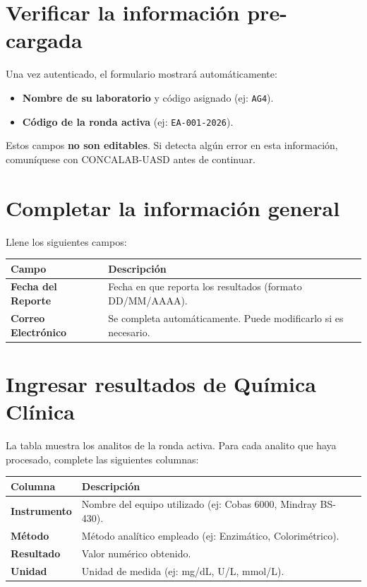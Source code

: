 \documentclass[12pt, letterpaper]{article}
\begin{document}
\section{Verificar la información pre-cargada}

Una vez autenticado, el formulario mostrará automáticamente:

\begin{itemize}[leftmargin=1.5em]
  \item \textbf{Nombre de su laboratorio} y código asignado (ej: \texttt{AG4}).
  \item \textbf{Código de la ronda activa} (ej: \texttt{EA-001-2026}).
\end{itemize}

Estos campos \textbf{no son editables}. Si detecta algún error en esta información, comuníquese con CONCALAB-UASD antes de continuar.

\section{Completar la información general}

Llene los siguientes campos:

\vspace{0.5em}
\begin{tabularx}{\linewidth}{>{\bfseries}lX}
  \toprule
  Campo & Descripción \\
  \midrule
  Fecha del Reporte    & Fecha en que reporta los resultados (formato DD/MM/AAAA). \\[4pt]
  Correo Electrónico   & Se completa automáticamente. Puede modificarlo si es necesario. \\
  \bottomrule
\end{tabularx}

\section{Ingresar resultados de Química Clínica}

La tabla muestra los analitos de la ronda activa. Para cada analito que haya procesado, complete las siguientes columnas:

\vspace{0.5em}
\begin{tabularx}{\linewidth}{>{\bfseries}lX}
  \toprule
  Columna & Descripción \\
  \midrule
  Instrumento & Nombre del equipo utilizado (ej: Cobas 6000, Mindray BS-430). \\[4pt]
  Método      & Método analítico empleado (ej: Enzimático, Colorimétrico). \\[4pt]
  Resultado   & Valor numérico obtenido. \\[4pt]
  Unidad      & Unidad de medida (ej: mg/dL, U/L, mmol/L). \\
  \bottomrule
\end{tabularx}
\end{document}
